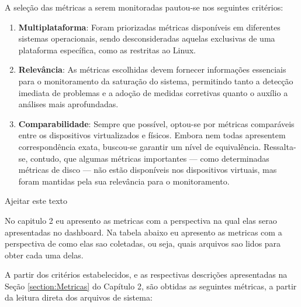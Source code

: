 A seleção das métricas a serem monitoradas pautou-se nos seguintes critérios:
\begin{enumerate}
\item \textbf{Multiplataforma}: Foram priorizadas métricas disponíveis em diferentes sistemas operacionais, sendo desconsideradas aquelas exclusivas de uma plataforma específica, como as restritas ao Linux.
\item \textbf{Relevância}: As métricas escolhidas devem fornecer informações essenciais para o monitoramento da saturação do sistema, permitindo tanto a detecção imediata de problemas e a adoção de medidas corretivas quanto o auxílio a análises mais aprofundadas.
\item \textbf{Comparabilidade}: Sempre que possível, optou-se por métricas comparáveis entre os dispositivos virtualizados e físicos. Embora nem todas apresentem correspondência exata, buscou-se garantir um nível de equivalência. Ressalta-se, contudo, que algumas métricas importantes --- como determinadas métricas de disco --- não estão disponíveis nos dispositivos virtuais, mas foram mantidas pela sua relevância para o monitoramento.
\end{enumerate}

{\color{brown}
Ajeitar este texto 

No capitulo 2 eu apresento as metricas com a perspectiva na qual elas serao apresentadas no dashboard. Na tabela abaixo eu apresento as metricas com a perspectiva de como elas sao coletadas, ou seja, quais arquivos sao lidos para obter cada uma delas.

A partir dos critérios estabelecidos, e as respectivas descrições apresentadas na Seção \ref{section:Metricas} do Capítulo 2, são obtidas as seguintes métricas, a partir da leitura direta dos arquivos de sistema:
}


